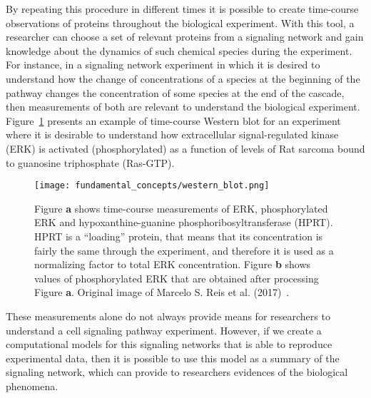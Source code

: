 By repeating this procedure in different times it is possible to create 
time-course observations of proteins throughout the biological 
experiment. With this tool, a researcher can choose a set of relevant 
proteins from a signaling network and gain knowledge about the dynamics 
of such chemical species during the experiment. For instance, in a 
signaling network experiment in which it is desired to understand how
the change of concentrations of a species at the beginning of the 
pathway changes the concentration of some species at the end of the 
cascade, then measurements of both are relevant to understand the 
biological experiment. Figure~\ref{fig:western_blot_example} presents an 
example of time-course Western blot for an experiment where it is 
desirable to understand how extracellular signal-regulated kinase (ERK)
is activated (phosphorylated) as a function of levels of Rat sarcoma
bound to guanosine triphosphate (Ras-GTP).

\begin{figure}[!ht]
\centering
    \texttt{[image: fundamental\_concepts/western\_blot.png]}
    \caption{Figure {\bf a} shows time-course measurements of ERK, 
    phosphorylated ERK and hypoxanthine-guanine 
    phosphoribosyltransferase (HPRT). HPRT is a ``loading'' protein, 
    that means that its concentration is fairly the same through the 
    experiment, and therefore it is used as a normalizing factor to 
    total ERK concentration. Figure  {\bf b} shows values of 
    phosphorylated ERK that are obtained after processing Figure 
    {\bf a}. Original image of Marcelo S. Reis et al. 
    (2017)~\cite{Reis2017}.}
    \label{fig:western_blot_example}
\end{figure}

These measurements alone do not always provide means for researchers to 
understand a cell signaling pathway experiment. However, if we create a 
computational models for this signaling networks that is able to 
reproduce experimental data, then it is possible to use this model as a 
summary of the signaling network, which can provide to researchers 
evidences of the biological phenomena.


